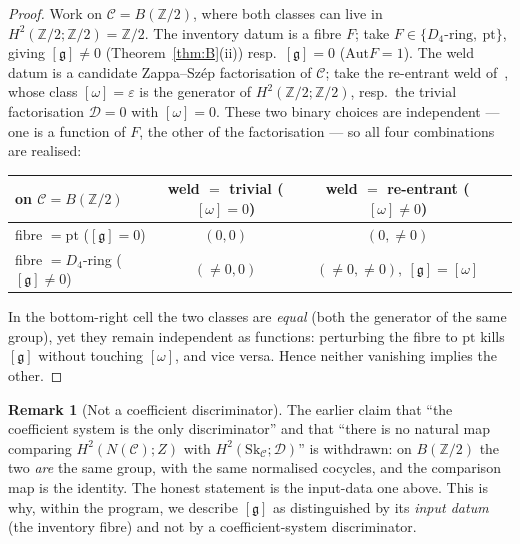 \documentclass[11pt]{article}
\theoremstyle{definition}
\newtheorem{remark}[theorem]{Remark}
\newcommand{\C}{\mathcal{C}}
\newcommand{\Sk}{\mathrm{Sk}}
\newcommand{\Z}{\mathbb{Z}}
\newcommand{\Aut}{\mathrm{Aut}}
\newcommand{\Zc}{Z}
\newcommand{\gerbe}{\mathfrak{g}}
\newcommand{\Dfr}{\mathcal{D}}
\begin{document}
\begin{proof}
Work on $\C=B(\Z/2)$, where both classes can live in $H^2(\Z/2;\Z/2)=\Z/2$. The inventory datum is
a fibre $F$; take $F\in\{D_4\text{-ring},\ \mathrm{pt}\}$, giving $[\gerbe]\neq0$
(Theorem~\ref{thm:B}(ii)) resp.\ $[\gerbe]=0$ ($\Aut F=1$). The weld datum is a candidate
Zappa--Sz\'ep factorisation of $\C$; take the re-entrant weld of~\cite{orch}, whose class
$[\omega]=\varepsilon$ is the generator of $H^2(\Z/2;\Z/2)$, resp.\ the trivial factorisation
$\Dfr=0$ with $[\omega]=0$. These two binary choices are independent --- one is a function of $F$,
the other of the factorisation --- so all four combinations are realised:

\begin{center}
\begin{tabular}{lccc}
\toprule
on $\C=B(\Z/2)$ & weld $=$ trivial ($[\omega]=0$) & weld $=$ re-entrant ($[\omega]\neq0$)\\
\midrule
fibre $=\mathrm{pt}$ ($[\gerbe]=0$) & $(0,0)$ & $(0,\neq0)$\\
fibre $=D_4$-ring ($[\gerbe]\neq0$) & $(\neq0,0)$ & $(\neq0,\neq0),\ [\gerbe]=[\omega]$\\
\bottomrule
\end{tabular}
\end{center}

In the bottom-right cell the two classes are \emph{equal} (both the generator of the same group),
yet they remain independent as functions: perturbing the fibre to $\mathrm{pt}$ kills $[\gerbe]$
without touching $[\omega]$, and vice versa. Hence neither vanishing implies the other.
\end{proof}

\begin{remark}[Not a coefficient discriminator]\label{rem:no-discriminator}
The earlier claim that ``the coefficient system is the only discriminator'' and that ``there is no
natural map comparing $H^2(N(\C);\Zc)$ with $H^2(\Sk_\C;\Dfr)$'' is withdrawn: on $B(\Z/2)$ the two
\emph{are} the same group, with the same normalised cocycles, and the comparison map is the
identity. The honest statement is the input-data one above. This is why, within the program, we
describe $[\gerbe]$ as distinguished by its \emph{input datum} (the inventory fibre) and not by a
coefficient-system discriminator.
\end{remark}
\end{document}
